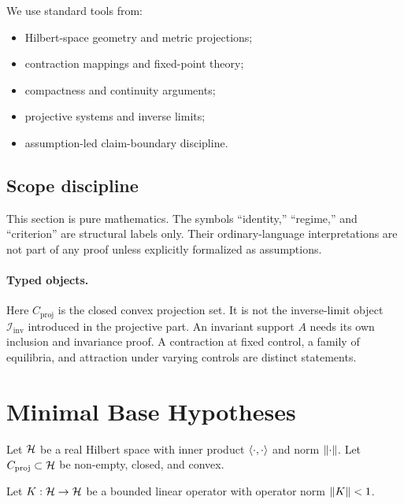 We use standard tools from:
\begin{itemize}[leftmargin=*]
\item Hilbert-space geometry and metric projections;
\item contraction mappings and fixed-point theory;
\item compactness and continuity arguments;
\item projective systems and inverse limits;
\item assumption-led claim-boundary discipline.
\end{itemize}

\subsection{Scope discipline}

This section is pure mathematics. The symbols ``identity,'' ``regime,'' and ``criterion'' are structural labels only. Their ordinary-language interpretations are not part of any proof unless explicitly formalized as assumptions.

\paragraph{Typed objects.}
Here ${C_{\mathrm{proj}}}$ is the closed convex projection set. It is not the inverse-limit object $\mathcal I_{\mathrm{inv}}$ introduced in the projective part. An invariant support $A$ needs its own inclusion and invariance proof. A contraction at fixed control, a family of equilibria, and attraction under varying controls are distinct statements.

\section{Minimal Base Hypotheses}

\begin{hypothesis}\label{hyp:H1}
Let $\mathcal{H}$ be a real Hilbert space with inner product $\left\langle \cdot, \cdot \right\rangle$ and norm $\left\lVert \cdot \right\rVert$. Let ${C_{\mathrm{proj}}} \subset \mathcal{H}$ be non-empty, closed, and convex.
\end{hypothesis}

\begin{hypothesis}\label{hyp:H2}
Let $K:\mathcal{H}\to\mathcal{H}$ be a bounded linear operator with operator norm $\left\lVert K \right\rVert<1$.
\end{hypothesis}

